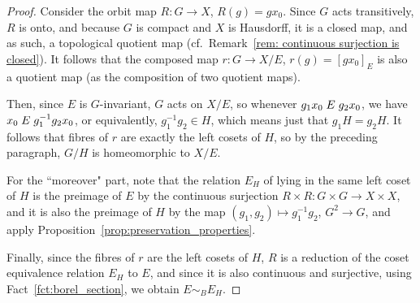 	\begin{proof}
		Consider the orbit map $R\colon G\to X$, $R(g)=gx_0$. Since $G$ acts transitively, $R$ is onto, and because $G$ is compact and $X$ is Hausdorff, it is a closed map, and as such, a topological quotient map (cf.\ Remark~\ref{rem: continuous surjection is closed}). It follows that the composed map $r\colon G\to X/E$, $r(g)=[gx_0]_E$ is also a quotient map (as the composition of two quotient maps).
		
		Then, since $E$ is $G$-invariant, $G$ acts on $X/E$, so whenever $g_1x_0\mathrel{E} g_2x_0$, we have $x_0\mathrel{E} g_1^{-1}g_2 x_0$, or equivalently, $g_1^{-1}g_2\in H$, which means just that $g_1H=g_2H$. It follows that fibres of $r$ are exactly the left cosets of $H$, so by the preceding paragraph, $G/H$ is homeomorphic to $X/E$.
		
		For the ``moreover" part, note that the relation $E_H$ of lying in the same left coset of $H$ is the preimage of $E$ by the continuous surjection $R\times R\colon G\times G\to X\times X$, and it is also the preimage of $H$ by the map $(g_1,g_2)\mapsto g_1^{-1}g_2$, $G^2\to G$, and apply Proposition~\ref{prop:preservation_properties}.
		
		Finally, since the fibres of $r$ are the left cosets of $H$, $R$ is a reduction of the coset equivalence relation $E_H$ to $E$, and since it is also continuous and surjective, using Fact~\ref{fct:borel_section}, we obtain $E\sim_BE_H$.
	\end{proof}
	
